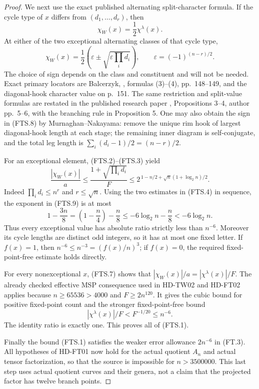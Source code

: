 \begin{proof}
We next use the exact published alternating split-character formula.
If the cycle type of \(x\) differs from \((d_1,\ldots,d_r)\), then
\[
                 \chi_W(x)=\frac12\chi^\lambda(x).
                 \tag{FTS.7}
\]
At either of the two exceptional alternating classes of that
cycle type,
\[
 \chi_W(x)=\frac12\left(\varepsilon
                \mathbin{\pm}\sqrt{\varepsilon\prod_i d_i}\right),
 \qquad \varepsilon=(-1)^{(n-r)/2}.
 \tag{FTS.8}
\]
The choice of sign depends on the class and constituent and will
not be needed.  Exact primary locators are Balcerzyk,
\cite{FTS:Balcerzyk1997}, formulas (3)--(4), pp.~148--149, and the
diagonal-hook character value on p.~151.  The same restriction and
split-value formulas are restated in the published research paper
\cite{FTS:YangStaroletov2021}, Propositions 3--4, author pp.~5--6,
with the branching rule in Proposition 5.
One may also obtain the sign in (FTS.8) by Murnaghan--Nakayama:
remove the unique rim hook of largest diagonal-hook length at
each stage; the remaining inner diagram is self-conjugate, and
the total leg length is \(\sum_i(d_i-1)/2=(n-r)/2\).

For an exceptional element, (FTS.2)--(FTS.3) yield
\[
 \frac{|\chi_W(x)|}{a}
 \le\frac{1+\sqrt{\prod_i d_i}}{F}
 \le 2^{\,1-n/2+\sqrt n(1+\log_2n)/2}.
 \tag{FTS.9}
\]
Indeed \(\prod_i d_i\le n^r\) and \(r\le\sqrt n\).
Using the two estimates in (FTS.4) in sequence, the exponent in
(FTS.9) is at most
\[
 1-\frac{3n}{8}
 =\left(1-\frac n4\right)-\frac n8
 \le-6\log_2n-\frac n8
 <-6\log_2n .
 \tag{FTS.10}
\]
Thus every exceptional value has absolute ratio strictly less
than \(n^{-6}\).  Moreover its cycle lengths are distinct odd
integers, so it has at most one fixed letter.  If \(f(x)=1\), then
\(n^{-6}\le n^{-3}=(f(x)/n)^3\); if \(f(x)=0\), the required
fixed-point-free estimate holds directly.

For every nonexceptional \(x\), (FTS.7) shows that
\(|\chi_W(x)|/a=|\chi^\lambda(x)|/F\).
The already checked effective MSP consequence used in HD-TW02
and HD-FT02 applies because \(n\ge65536>4000\) and
\(F\ge2n^{120}\).  It gives the cubic bound for positive fixed-point
count and the stronger fixed-point-free bound
\[
                  |\chi^\lambda(x)|/F<F^{-1/20}
                                      \le n^{-6}.
                  \tag{FTS.11}
\]
The identity ratio is exactly one.  This proves all of (FTS.1).

Finally the bound (FTS.1) satisfies the weaker error allowance
\(2n^{-6}\) in (FT.3).  All hypotheses of HD-FT01 now hold for the
actual quotient \(A_n\) and actual tensor factorization, so that
the source is impossible for \(n>3500000\).
This last step uses actual quotient curves and their genera, not
a claim that the projected factor has twelve branch points.
\end{proof}

